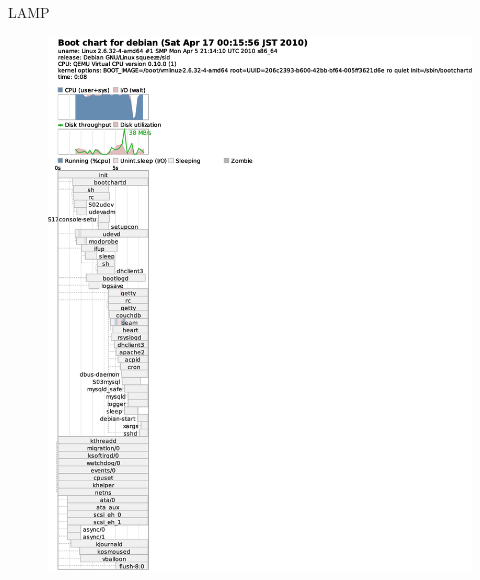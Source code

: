 \begin{frame}{LAMP}
\begin{minipage}[t]{0.48\hsize}
\begin{figure}[h]
\begin{center}
\includegraphics[width=1.0\hsize]{image201004/upstart/upstart-lamp-bootchart.eps}
\end{center}
\end{figure}
\end{minipage}
\end{frame}

